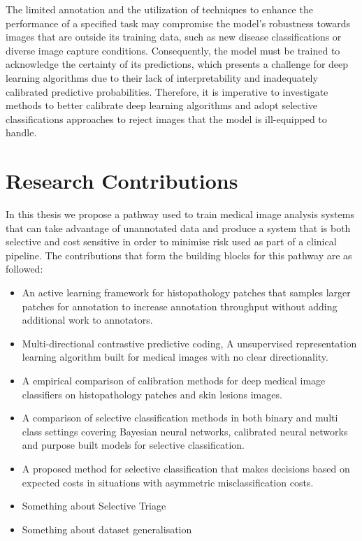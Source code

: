 The limited annotation and the utilization of techniques to enhance the performance of a specified task may compromise the model's robustness towards images that are outside its training data, such as new disease classifications or diverse image capture conditions. Consequently, the model must be trained to acknowledge the certainty of its predictions, which presents a challenge for deep learning algorithms due to their lack of interpretability and inadequately calibrated predictive probabilities. Therefore, it is imperative to investigate methods to better calibrate deep learning algorithms and adopt selective classifications approaches to reject images that the model is ill-equipped to handle.

\section{Research Contributions}
\label{sec:research_contributions}

In this thesis we propose a pathway used to train medical image analysis systems that can take advantage of unannotated data and produce a system that is both selective and cost sensitive in order to minimise risk used as part of a clinical pipeline. The contributions that form the building blocks for this pathway are as followed:

\begin{itemize}
	\item An active learning framework for histopathology patches that samples larger patches for annotation to increase annotation throughput without adding additional work to annotators.
	
	\item Multi-directional contrastive predictive coding, A unsupervised representation learning algorithm built for medical images with no clear directionality.

	\item A empirical comparison of calibration methods for deep medical image classifiers on histopathology patches and skin lesions images.
	
	\item A comparison of selective classification methods in both binary and multi class settings covering Bayesian neural networks, calibrated neural networks and purpose built models for selective classification.
	
	\item A proposed method for selective classification that makes decisions based on expected costs in situations with asymmetric misclassification costs.
	
	\item Something about Selective Triage
	
	\item Something about dataset generalisation
\end{itemize}



